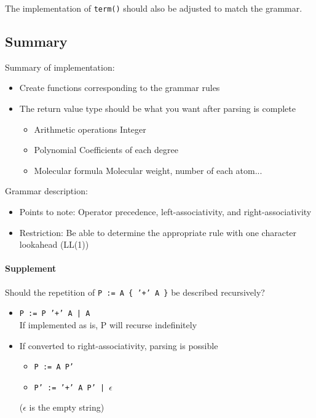 The implementation of \texttt{term()} should also be adjusted to match the grammar.

\subsection{Summary}
Summary of implementation:
  \begin{itemize}
\setlength{\itemsep}{0pt}
  \item Create functions corresponding to the grammar rules
  \item The return value type should be what you want after parsing is complete
    \begin{itemize}
\setlength{\itemsep}{0pt}
    \item Arithmetic operations \dingright Integer
    \item Polynomial \dingright Coefficients of each degree
    \item Molecular formula \dingright Molecular weight, number of each atom...
    \end{itemize}
  \end{itemize}

Grammar description:
  \begin{itemize}
\setlength{\itemsep}{0pt}
  \item Points to note: Operator precedence, left-associativity, and right-associativity
  \item Restriction: Be able to determine the appropriate rule with one character lookahead (LL(1))
  \end{itemize}


\paragraph{Supplement}

Should the repetition of \texttt{P := A \{ '+' A \}} be described recursively?
\begin{itemize}
\setlength{\itemsep}{0pt}
\item \texttt{P := P '+' A | A}\\
\dingright If implemented as is, P will recurse indefinitely
\item If converted to right-associativity, parsing is possible
  \begin{itemize}
\setlength{\itemsep}{0pt}
  \item \texttt{P := A P'}
  \item \texttt{P' := '+' A P' | $\epsilon$}
  \end{itemize}
($\epsilon$ is the empty string)
\end{itemize}

